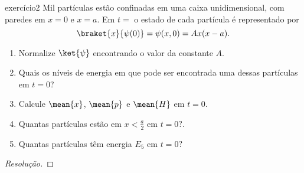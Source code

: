 \begin{exercício}{}{exercício2}
    Mil partículas estão confinadas em uma caixa unidimensional, com paredes em \(x = 0\) e \(x = a\). Em \(t = \) o estado de cada partícula é representado por
    \begin{equation*}
        \braket{x}{\psi(0)} = \psi(x,0) = A x(x-a).
    \end{equation*}
    \begin{enumerate}[label=(\alph*)]
        \item Normalize \(\ket{\psi}\) encontrando o valor da constante \(A\).
        \item Quais os níveis de energia em que pode ser encontrada uma dessas partículas em \(t = 0\)?
        \item Calcule \(\mean{x}\), \(\mean{p}\) e \(\mean{H}\) em \(t = 0\).
        \item Quantas partículas estão em \(x < \frac{a}2\) em \(t = 0?\).
        \item Quantas partículas têm energia \(E_5\) em \(t = 0?\)
    \end{enumerate}
\end{exercício}
\begin{proof}[Resolução]

\end{proof}
